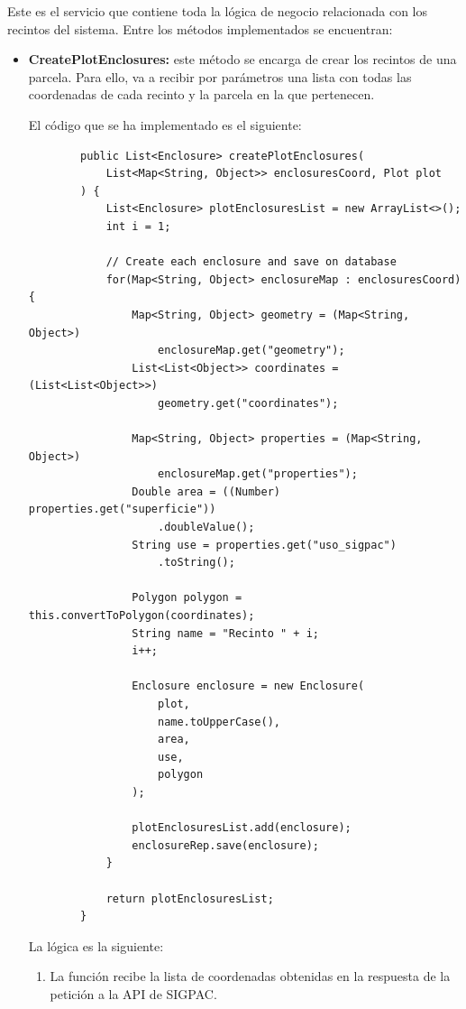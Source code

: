 Este es el servicio que contiene toda la lógica de negocio relacionada con los recintos del sistema. Entre los métodos implementados se encuentran:

\begin{itemize}
    \item \textbf{CreatePlotEnclosures:} este método se encarga de crear los recintos de una parcela. Para ello, va a recibir por parámetros una lista con todas las coordenadas de cada recinto y la parcela en la que pertenecen.
    
    El código que se ha implementado es el siguiente:

    \begin{verbatim}
        public List<Enclosure> createPlotEnclosures(
            List<Map<String, Object>> enclosuresCoord, Plot plot
        ) {
            List<Enclosure> plotEnclosuresList = new ArrayList<>();
            int i = 1;

            // Create each enclosure and save on database
            for(Map<String, Object> enclosureMap : enclosuresCoord) {
                Map<String, Object> geometry = (Map<String, Object>) 
                    enclosureMap.get("geometry");
                List<List<Object>> coordinates = (List<List<Object>>) 
                    geometry.get("coordinates");
                
                Map<String, Object> properties = (Map<String, Object>) 
                    enclosureMap.get("properties");
                Double area = ((Number) properties.get("superficie"))
                    .doubleValue();
                String use = properties.get("uso_sigpac")
                    .toString();

                Polygon polygon = this.convertToPolygon(coordinates);
                String name = "Recinto " + i;
                i++;

                Enclosure enclosure = new Enclosure(
                    plot,
                    name.toUpperCase(),
                    area,
                    use,
                    polygon
                );

                plotEnclosuresList.add(enclosure);
                enclosureRep.save(enclosure);
            }

            return plotEnclosuresList;
        }
    \end{verbatim}

    La lógica es la siguiente:

    \begin{enumerate}
        \item La función recibe la lista de coordenadas obtenidas en la respuesta de la petición a la API de SIGPAC.
        

\end{enumerate}
\end{itemize}
